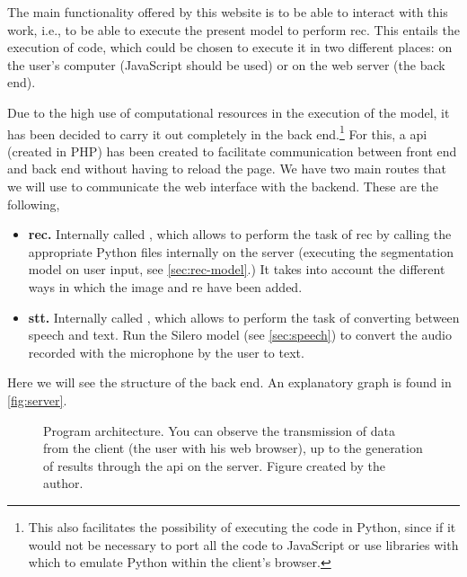 The main functionality offered by this website is to be able to interact with
this work, i.e., to be able to execute the present model to perform
\gls{rec}. This entails the execution of code, which could be chosen to execute
it in two different places: on the user's computer (JavaScript should be used)
or on the web server (the back end).

Due to the high use of computational resources in the execution of the model,
it has been decided to carry it out completely in the back end.\footnote{This
  also facilitates the possibility of executing the code in Python, since if it
  would not be necessary to port all the code to JavaScript or use libraries
  with which to emulate Python within the client's browser.} For this, a
\gls{api} (created in PHP) has been created to facilitate communication between
front end and back end without having to reload the page. We have two main
routes that we will use to communicate the web interface with the
backend. These are the following,
\begin{itemize}
  \item \textbf{\gls{rec}.} Internally called , which
  allows to perform the task of \gls{rec} by calling the appropriate Python
  files internally on the server (executing the segmentation model on user
  input, see \vref{sec:rec-model}.) It takes into account the different ways in
  which the image and \gls{re} have been added.
  \item \textbf{\gls{stt}.} Internally called , which allows
  to perform the task of converting between speech and text. Run the Silero
  model (see \vref{sec:speech}) to convert the audio recorded with the
  microphone by the user to text.
\end{itemize}

Here we will see the structure of the back end. An explanatory graph is found
in \vref{fig:server}.

\begin{figure}[p]
  \centering
  \resizebox{\textwidth}{!}{}
  \caption[Program architecture]{Program architecture. You can observe the
    transmission of data from the client (the user with his web browser), up to
    the generation of results through the \gls{api} on the server. Figure
    created by the author.}\label{fig:server}
\end{figure}
